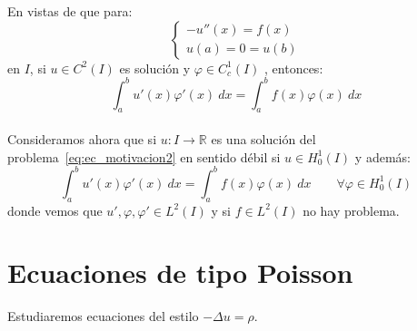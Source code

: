 \noindent
En vistas de que para:
\begin{equation}\label{eq:ec_motivacion2}
    \left\{\begin{array}{l}
        -u''(x) = f(x) \\
        u(a) = 0 = u(b)
    \end{array}\right.
\end{equation}
en $I$, si $u\in C^2(I)$ es solución y $\varphi \in C^1_c(I)$ , entonces:
\begin{equation*}
    \int_{a}^{b} u'(x)\varphi'(x)~dx = \int_{a}^{b} f(x)\varphi(x)~dx 
\end{equation*}~\\

\noindent
Consideramos ahora que si $u:I\to \mathbb{R}$ es una solución del problema~\eqref{eq:ec_motivacion2} en sentido débil si $u\in H^1_0(I)$ y además:
\begin{equation*}
    \int_{a}^{b} u'(x)\varphi'(x)~dx = \int_{a}^{b} f(x)\varphi(x)~dx \qquad \forall \varphi \in H^1_0(I)
\end{equation*}
donde vemos que $u',\varphi,\varphi'\in L^2(I)$ y si $f\in L^2(I)$ no hay problema.

\section{Ecuaciones de tipo Poisson}
\noindent
Estudiaremos ecuaciones del estilo $-\Delta u = \rho$.

